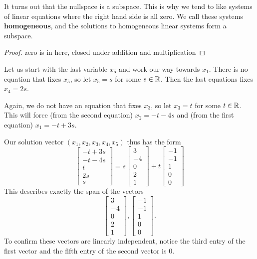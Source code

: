 It turns out that the nullspace is a subspace. This is why we tend to like systems of linear equations where the right hand side is all zero.
We call these systems \textbf{homogeneous}, and the solutions to homogeneous linear systems form a subspace.
\begin{proof}
	\todo zero is in here, closed under addition and multiplication
\end{proof}
Let us start with the last variable $x_5$ and work our way towards $x_1$.
There is no equation that fixes $x_5$, so let $x_5 = s$ for some $s\in\mathbb{R}$.
Then the last equations fixes $x_4 = 2s$. 

Again, we do not have an equation that fixes $x_3$, so let $x_3=t$ for some $t\in\mathbb{R}$.
This will force (from the second equation) $x_2= -t-4s$ and (from the first equation) $x_1 = -t+3s$.

Our solution vector $(x_1,x_2,x_3,x_4,x_5)$ thus has the form \[
\begin{bmatrix}
	-t+3s\\ -t-4s\\ t\\ 2s\\ s
\end{bmatrix}= s\begin{bmatrix}
	3 \\ -4 \\ 0 \\ 2 \\ 1
\end{bmatrix} + t \begin{bmatrix}
	-1 \\ -1 \\ 1 \\0 \\0
\end{bmatrix}
\]
This describes exactly the span of the vectors \[
	\begin{bmatrix}
		3 \\ -4 \\ 0 \\ 2 \\ 1
	\end{bmatrix} ,
	\begin{bmatrix}
		-1 \\ -1 \\ 1 \\0 \\0
	\end{bmatrix}.
\]
To confirm these vectors are linearly independent, notice the third entry of the first vector and the fifth entry of the second vector is $0$.

